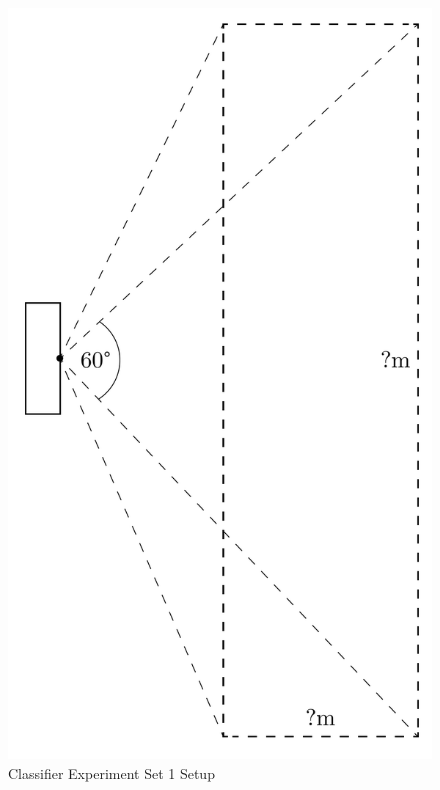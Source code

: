\documentclass[../thesis/thesis.tex]{subfiles}
\begin{document}
\begin{figure}
 \includegraphics[height=0.8\textheight,page=2]{../diagrams/third-exp-setup.pdf}
 \caption{Classifier Experiment Set 1 Setup}
 \label{fig:exps:3setup}
 \end{figure}

\end{document}
